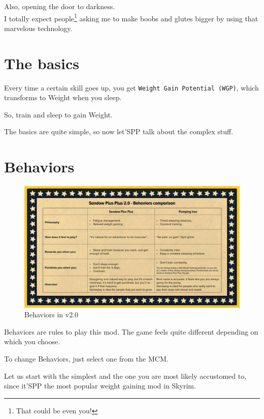 \documentclass[11pt]{article}
\newcommand{\code}[1]{\small\texttt{#1}}
\newcommand{\w}{Weight}
\newcommand{\W}{WGP}
\newcommand{\Bs}{Behaviors}
\begin{document}
Also, opening the door to darkness.\\
I totally expect people\footnote{That could be even you!} asking me to make boobs and glutes bigger by using that marvelous technology.
\pagebreak

\section{The basics}
\begin{compactitem}
    \item  Every time a certain skill goes up, you get \code{Weight Gain Potential (\W)}, which transforms to \w{} when you sleep.
	\item So, train and sleep to gain \w.
\end{compactitem}

The basics are quite simple, so now let'SPP talk about the complex stuff.

\section{\Bs}

\begin{figure}[h]
    \centering
    \includegraphics[width=\linewidth]{behavior-table}
    \caption{\Bs{} in v2.0}
    \label{fig:behavior-table}
\end{figure}

\Bs{} are rules to play this mod. The game feels quite different depending on which you choose.

To change \Bs, just select one from the MCM.

Let us start with the simplest and the one you are most likely accustomed to, since it'SPP the most popular weight gaining mod in Skyrim.
\end{document}

